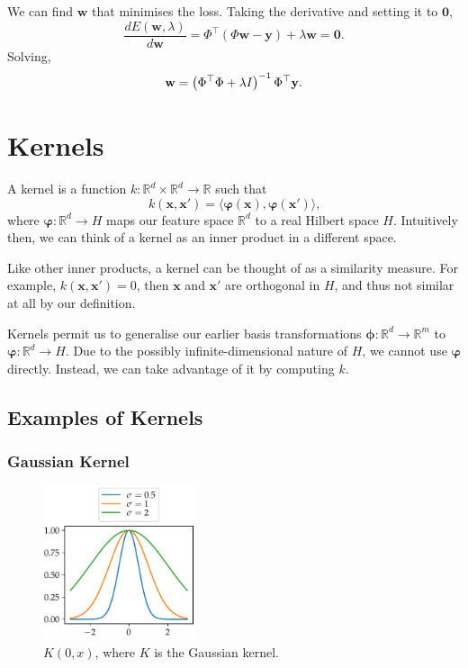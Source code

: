 \documentclass[11pt,twoside]{report}
\newcommand\bw{\mathbf{w}}
\newcommand\bx{\mathbf{x}}
\newcommand\by{\mathbf{y}}
\newcommand\bphi{\bm{\phi}}
\newcommand\bvarphi{\bm{\varphi}}
\newcommand\bbR{\mathbb{R}}
\begin{document}
We can find $\bw$ that minimises the loss. Taking the derivative and setting it to $\mathbf{0}$,\[
    \frac{dE(\bw, \lambda)}{d\bw} = \Phi^\top(\Phi\bw - \by) + \lambda \bw = \mathbf{0} \text{.}
\] Solving,\[
    \bw = \left(\Phi^\top\Phi + \lambda I\right)^{-1}\Phi^\top\by \text.
\]

\section{Kernels}

A kernel is a function $k : \bbR^d \times \bbR^d \to \bbR$ such that \[
    k(\bx, \bx') = \langle \bvarphi\left(\bx\right), \bvarphi\left(\bx'\right)\rangle \text{,}
\] where $\bvarphi : \bbR^d \to H$ maps our feature space $\bbR^d$ to a real Hilbert space $H$. Intuitively then, we can think of a kernel as an inner product in a different space.

Like other inner products, a kernel can be thought of as a similarity measure. For example, $k(\bx, \bx') = 0$, then $\bx$ and $\bx'$ are orthogonal in $H$, and thus not similar at all by our definition.

Kernels permit us to generalise our earlier basis transformations $\bphi : \bbR^d \to \bbR^m$ to $\bvarphi : \bbR^d \to H$. Due to the possibly infinite-dimensional nature of $H$, we cannot use $\bvarphi$ directly. Instead, we can take advantage of it by computing $k$.

\subsection{Examples of Kernels}
\subsubsection{Gaussian Kernel}

  \begin{figure}
    \centering
    \includegraphics[width=0.4\textwidth]{gaussian_kernel_plot.pdf}
    \caption{$K(0, x)$, where $K$ is the Gaussian kernel.}
    \label{fig:gaussian_kernel}
  \end{figure}
\end{document}
